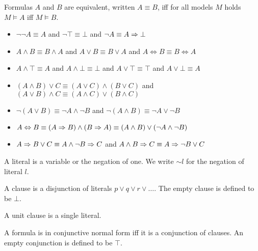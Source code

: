 \begin{mytitle}[Equivalence] Formulas $A$ and $B$ are equivalent, written $A \equiv B$, iff for all models $M$ holds $M \models A$ iff $M \models B$.
\end{mytitle}
\begin{mytitle}\hfill
\begin{itemize}
    \item $\lnot\lnot A \equiv A$ and $\lnot\top\equiv\bot$ and $\lnot A \equiv A \Rightarrow \bot$
    \item $A \land B \equiv B \land A$ and $A \lor B \equiv B \lor A$ and $A \Leftrightarrow B \equiv B \Leftrightarrow A$
    \item $A\land \top \equiv A$ and $A\land \bot \equiv \bot$ and $A\lor \top \equiv \top$ and $A\lor \bot \equiv A$
    \item $(A\land B) \lor C \equiv (A\lor C) \land (B\lor C)$ and $(A\lor B) \land C \equiv (A\land C) \lor (B \land C)$
    \item $\lnot(A\lor B) \equiv \lnot A \land \lnot B$ and $\lnot(A\land B) \equiv \lnot A \lor \lnot B$
    \item $A\Leftrightarrow B \equiv (A\Rightarrow B) \land (B\Rightarrow A) \equiv (A\land B) \lor (\lnot A \land \lnot B)$
    \item $A\Rightarrow B\lor C \equiv A\land \lnot B \Rightarrow C$ and $A\land B \Rightarrow C \equiv A \Rightarrow \lnot B \lor C$
\end{itemize}
\end{mytitle}
\begin{mytitle}[Literal] A literal is a variable or the negation of one. We write $\sim l$ for the negation of literal $l$.
\end{mytitle}
\begin{mytitle}[Clause] A clause is a disjunction of literals $p\lor q\lor r\lor \ldots$. The empty clause is defined to be $\bot$.
\begin{mytitle} A unit clause is a single literal.
\end{mytitle}
\begin{mytitle} A formula is in conjunctive normal form iff it is a conjunction of clauses. An empty conjunction is defined to be $\top$.
\end{mytitle}
\end{mytitle}

